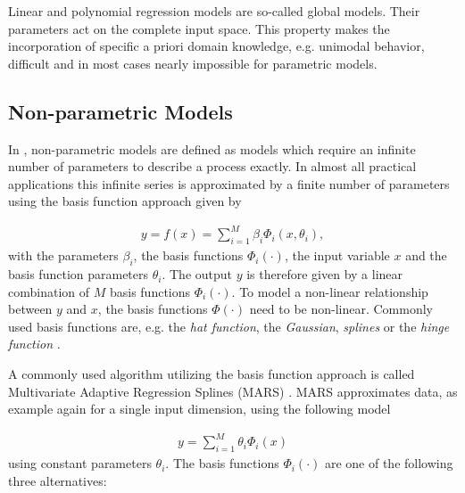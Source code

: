 Linear and polynomial regression models are so-called global models. Their parameters act on the complete input space. This property makes the incorporation of specific a priori domain knowledge, e.g. unimodal behavior, difficult and in most cases nearly impossible for parametric models. 

\subsection{Non-parametric Models}

In \cite{nelles2013nonlinear}, non-parametric models are defined as models which require an infinite number of parameters to describe a process exactly. In almost all practical applications this infinite series is approximated by a finite number of parameters using the basis function approach given by

\begin{align} \label{eq:basis-function-approach}
	y = f(x) = \sum_{i=1}^M \beta_i \Phi_i(x, \theta_i),
\end{align} 
%
with the parameters $\beta_i$, the basis functions $\Phi_i(\cdot)$, the input variable $x$ and the basis function parameters $\theta_i$. The output $y$ is therefore given by a linear combination of $M$ basis functions $\Phi_i(\cdot)$. To model a non-linear relationship between $y$ and $x$, the basis functions $\Phi(\cdot)$ need to be non-linear. Commonly used basis functions are, e.g. the \emph{hat function}, the \emph{Gaussian}, \emph{splines} or the \emph{hinge function} \cite{friedman2001elements}. 

A commonly used algorithm utilizing the basis function approach is called Multivariate Adaptive Regression Splines (MARS) \cite{friedman1991multivariate}. MARS approximates data, as example again for a single input dimension, using the following model

\begin{align} \label{eq:MARS}
	y = \sum_{i=1}^M \theta_i \Phi_i(x)
\end{align}
%
using constant parameters $\theta_i$. The basis functions $\Phi_i(\cdot)$ are one of the following three alternatives:

